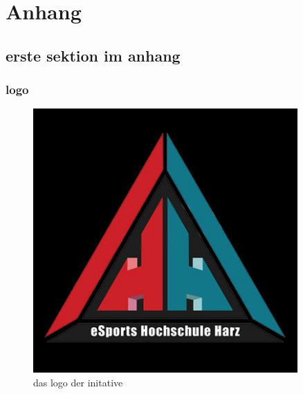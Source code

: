 \appendix

\section*{Anhang}

\subsection{erste sektion im anhang}

    \subsubsection{logo}

    \begin{figure}[H]
        \centering
        \includegraphics[width=0.9\textwidth]{graphics/logo black.jpg}
        \caption[logo]{das logo der initative}
        \label{fig:appendix_logo}
    \end{figure}